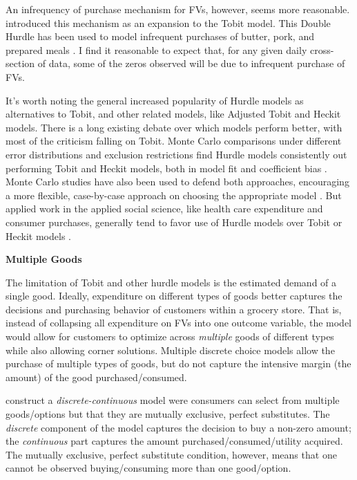 \documentclass[12pt,letterpaperpaper,]{book}
\begin{document}
An infrequency of purchase mechanism for FVs, however, seems more
reasonable. \citet{deaton_statistical_1984} introduced this mechanism as
an expansion to the Tobit model. This Double Hurdle has been used to
model infrequent purchases of butter, pork, and prepared meals
\citep{yen_modeling_1995, su_microeconometric_1996, newman_double-hurdle_2003}.
I find it reasonable to expect that, for any given daily cross-section
of data, some of the zeros observed will be due to infrequent purchase
of FVs.

It's worth noting the general increased popularity of Hurdle models as
alternatives to Tobit, and other related models, like Adjusted Tobit and
Heckit models. There is a long existing debate over which models perform
better, with most of the criticism falling on Tobit. Monte Carlo
comparisons under different error distributions and exclusion
restrictions find Hurdle models consistently out performing Tobit and
Heckit models, both in model fit and coefficient bias
\citep{hay_ordinary_1987, manning_monte_1987}. Monte Carlo studies have
also been used to defend both approaches, encouraging a more flexible,
case-by-case approach on choosing the appropriate model
\citep{leung_choice_1996, dow_choosing_2003, madden_sample_2008}. But
applied work in the applied social science, like health care expenditure
and consumer purchases, generally tend to favor use of Hurdle models
over Tobit or Heckit models
\citep{yen_working_1993, smith_tobit_2003, stewart_tobit_2013}.

\textbf{Multiple Goods}

The limitation of Tobit and other hurdle models is the estimated demand
of a single good. Ideally, expenditure on different types of goods
better captures the decisions and purchasing behavior of customers
within a grocery store. That is, instead of collapsing all expenditure
on FVs into one outcome variable, the model would allow for customers to
optimize across \emph{multiple} goods of different types while also
allowing corner solutions. Multiple discrete choice models allow the
purchase of multiple types of goods, but do not capture the intensive
margin (the amount) of the good purchased/consumed.

\citet{dubin_econometric_1984} construct a \emph{discrete-continuous}
model were consumers can select from multiple goods/options but that
they are mutually exclusive, perfect substitutes. The \emph{discrete}
component of the model captures the decision to buy a non-zero amount;
the \emph{continuous} part captures the amount
purchased/consumed/utility acquired. The mutually exclusive, perfect
substitute condition, however, means that one cannot be observed
buying/consuming more than one good/option.
\end{document}
